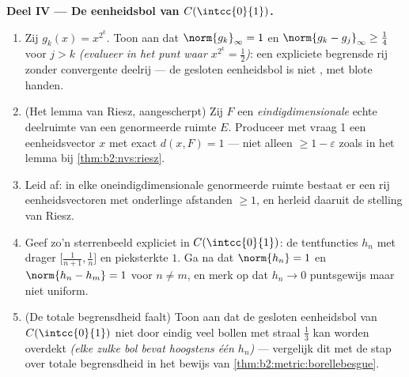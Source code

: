 \begin{problem}
\medskip
\noindent\textbf{Deel IV --- De eenheidsbol van
$C(\intcc{0}{1})$.}
\begin{enumerate}[resume]
  \item Zij $g_k(x) = x^{2^k}$. Toon aan dat $\norm{g_k}_\infty =
        1$ en $\norm{g_k - g_j}_\infty \geq \frac14$ voor $j > k$
        \emph{(evalueer in het punt waar $x^{2^k} = \frac12$)}:
        een expliciete begrensde rij zonder convergente deelrij
        --- de gesloten eenheidsbol is niet , met blote
        handen.
  \item (Het lemma van Riesz, aangescherpt) Zij $F$ een
        \emph{eindigdimensionale} echte deelruimte van een
        genormeerde ruimte $E$. Produceer met vraag 1 een
        eenheidsvector $x$ met exact $d(x, F) = 1$ --- niet
        alleen $\geq 1 - \varepsilon$ zoals in het lemma bij
        \cref{thm:b2:nvs:riesz}.
  \item Leid af: in elke oneindigdimensionale genormeerde ruimte
        bestaat er een rij eenheidsvectoren met onderlinge
        afstanden $\geq 1$, en herleid daaruit de stelling van
        Riesz.
  \item Geef zo'n sterrenbeeld expliciet in $C(\intcc{0}{1})$: de
        tentfuncties $h_n$ met drager
        $\bigl[\frac1{n+1}, \frac1n\bigr]$ en pieksterkte $1$. Ga
        na dat $\norm{h_n} = 1$ en $\norm{h_n - h_m} = 1$ voor $n
        \neq m$, en merk op dat $h_n \to 0$ puntsgewijs maar niet
        uniform.
  \item (De totale begrensdheid faalt) Toon aan dat de gesloten
        eenheidsbol van $C(\intcc{0}{1})$ niet door eindig veel
        bollen met straal $\frac13$ kan worden overdekt
        \emph{(elke zulke bol bevat hoogstens één $h_n$)} ---
        vergelijk dit met de stap over totale begrensdheid in het
        bewijs van \cref{thm:b2:metric:borellebesgue}.
\end{enumerate}


\end{problem}
